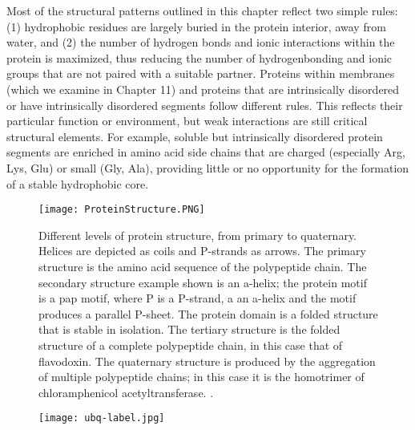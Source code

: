Most of the structural patterns outlined in this chapter reflect two simple rules: (1) hydrophobic residues are largely buried in the protein interior, away from water, and (2) the number of hydrogen bonds and ionic interactions within the protein is maximized, thus reducing the number of hydrogenbonding and ionic groups that are not paired with a suitable partner. Proteins within membranes (which we examine in Chapter 11) and proteins that are intrinsically disordered or have intrinsically disordered segments follow different rules. This reflects their particular function or environment, but weak interactions are still critical structural elements. For example, soluble but intrinsically disordered protein segments are enriched in amino acid side chains that are charged (especially Arg, Lys, Glu) or small (Gly, Ala), providing little or no opportunity for the formation of a stable hydrophobic core. 

\begin{figure}[h]
\centering
\begin{minipage}[t]{0.875\textwidth}
\centering
\texttt{[image: ProteinStructure.PNG]}

\caption{\small{Different levels of  protein structure, from primary to quaternary. Helices are depicted as coils and P-strands as arrows. The primary structure is the amino acid sequence of the polypeptide chain. The secondary structure example shown is an a-helix; the protein motif is  a pap motif, where P is a P-strand, a an a-helix and the motif produces a parallel P-sheet. The protein domain is a folded structure that is stable in isolation. The tertiary structure is the folded structure of a complete polypeptide chain, in this case that of flavodoxin. The quaternary structure is produced by the aggregation of multiple polypeptide chains; in this case it is the homotrimer of  chloramphenicol acetyltransferase. 
\cite{creighton2010biophysical}.}}

\label{fig:ubq}
\end{minipage} 
\end{figure}

\begin{figure}[h]
\centering
\begin{minipage}[t]{0.6\textwidth}
\centering
\texttt{[image: ubq-label.jpg]}

\caption{\small{}}

\label{fig:ProteinStructure}
\end{minipage} 
\end{figure}

